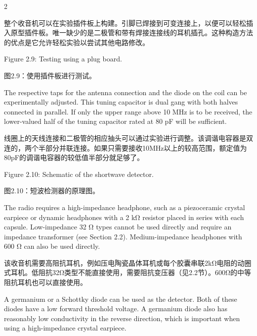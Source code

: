 \documentclass{ctexbook}
\begin{document}
\begin{paracol}{2}
\switchcolumn

整个收音机可以在实验插件板上构建。引脚已焊接到可变连接上，以便可以轻松插入原型插件板。唯一缺少的是二极管和带有焊接连接线的耳机插孔。这种构造方法的优点是它允许轻松实验以尝试其他电路修改。

\switchcolumn*

Figure 2.9: Testing using a plug board. 

\switchcolumn

图2.9：使用插件板进行测试。

\switchcolumn*

The respective taps for the antenna connection and the diode on the coil can be experimentally adjusted. This tuning capacitor is dual gang with both halves connected in parallel. If 
only the upper range above 10 MHz is to be received, the lower-valued half of the tuning 
capacitor rated at 80 pF will be sufficient. 

\switchcolumn

线圈上的天线连接和二极管的相应抽头可以通过实验进行调整。该调谐电容器是双连的，两个半部分并联连接。如果只需要接收10MHz以上的较高范围，额定值为80pF的调谐电容器的较低值半部分就足够了。

\switchcolumn*

Figure 2.10: Schematic of the shortwave detector. 

\switchcolumn

图2.10：短波检测器的原理图。

\switchcolumn*

The radio requires a high-impedance headphone, such as a piezoceramic crystal earpiece 
or dynamic headphones with a 2 kΩ resistor placed in series with each capsule. Low-impedance 32 Ω types cannot be used directly and require an impedance transformer (see 
Section 2.2). Medium-impedance headphones with 600 Ω can also be used directly. 

\switchcolumn

该收音机需要高阻抗耳机，例如压电陶瓷晶体耳机或每个胶囊串联2kΩ电阻的动圈式耳机。低阻抗32Ω类型不能直接使用，需要阻抗变压器（见2.2节）。600Ω的中等阻抗耳机也可以直接使用。

\switchcolumn*

A germanium or a Schottky diode can be used as the detector. Both of these diodes have 
a low forward threshold voltage. A germanium diode also has reasonably low conductivity 
in the reverse direction, which is important when using a high-impedance crystal earpiece. 

\switchcolumn


\end{paracol}
\end{document}
